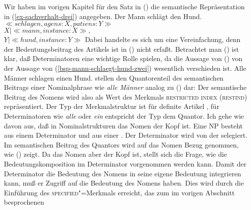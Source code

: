 Wir haben im vorigen Kapitel für den Satz in () die semantische
Repräsentation in (\ref{ex-sachverhalt-drei}) angegeben.
\ea
\label{bsp-mann-schlaegt-hund-zwei}
Der Mann schlägt den Hund.
\z
\ea
\label{ex-sachverhalt-drei}
$\ll schlagen, agens:X, patiens:Y\gg$\\
$X|\ll mann, instance:X\gg,$\\
$Y|\ll hund, instance:Y\gg$
\z
Dabei handelte es sich um eine Vereinfachung, denn der Bedeutungsbeitrag
des Artikels ist in () nicht erfaßt. Betrachtet man () ist klar,
daß Determinatoren eine wichtige Rolle spielen, da die Aussage von ()
von der Aussage von (\ref{bsp-mann-schlaegt-hund-zwei}) wesentlich verschieden ist.
\ea
Alle Männer schlagen einen Hund.
\z
\citet[]{ps2} stellen den Quantorenteil des semantischen Beitrags einer Nominalphrase wie \emph{alle Männer}
analog zu () dar:
\ea
{}
\z
Der semantische Beitrag des Nomens wird also als Wert des Merkmals \textsc{restricted index} (\textsc{restind})
repräsentiert. Der Typ der Merkmalstruktur ist für definite Artikel , für Determinatoren wie \emph{alle} 
oder \emph{ein} entspricht der Typ dem Quantor.
%
Ich gehe wie \citet[]{ps2} davon aus, daß in Nominalstrukturen das Nomen der Kopf ist. Eine NP besteht
aus einem Determinator und aus einer \nbar. Der Determinator wird von der \nbar selegiert.
Im semantischen Beitrag des Quantors wird auf das Nomen Bezug genommen, wie () zeigt. Da das
Nomen aber der Kopf ist, stellt sich die Frage, wie die Bedeutungskomposition im Determinator vorgenommen werden kann.
Damit der Determinator die Bedeutung des Nomens in seine eigene Bedeutung integrieren kann,
muß er Zugriff auf die Bedeutung des Nomens haben. Dies wird durch die Einführung des
\textsc{specified}"=Merkmals erreicht, das zum im vorigen Abschnitt besprochenen \modm
